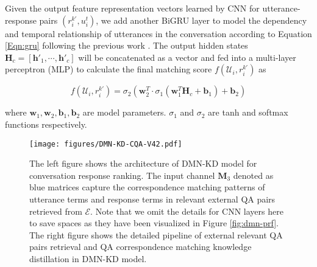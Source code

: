 
Given the output feature representation vectors learned by CNN for utterance-response pairs $(r_i^{k'}, u_i^t)$, we add another BiGRU layer to model the dependency and temporal relationship of utterances in the conversation according to Equation \ref{Eqn:gru} following the previous work \cite{DBLP:conf/acl/WuWXZL17}.  The output hidden states $\mathbf{H}_c = [\mathbf{h'}_1, \cdots, \mathbf{h'}_c]$ will be concatenated as a vector and fed into a multi-layer perceptron (MLP) to calculate the final matching score $f( \mathcal{U}_i, r_i^{k'} ) $  as
 \begin{footnotesize}
\begin{equation}
f( \mathcal{U}_i, r_i^{k'} )  = \sigma_2( \mathbf{w}_2^T \cdot \sigma_1 (\mathbf{w}_1^T\mathbf{H}_c + \mathbf{b}_1    ) + \mathbf{b}_2)
\end{equation}
\end{footnotesize}
where $\mathbf{w}_1, \mathbf{w}_2,\mathbf{b}_1,\mathbf{b}_2$ are model parameters. $\sigma_1$ and $\sigma_2$ are tanh and softmax functions respectively.

\begin{figure*}[th]
	\center
	\texttt{[image: figures/DMN-KD-CQA-V42.pdf]}
	\caption{The left figure shows the architecture of DMN-KD model for conversation response ranking. The input channel $\mathbf{M}_3$ denoted as blue matrices capture the correspondence matching patterns of utterance terms and response terms in relevant external QA pairs retrieved from $\mathcal{E}$. Note that we omit the details for CNN layers here to save spaces as they have been visualized in Figure \ref{fig:dmn-prf}. The right figure shows the detailed pipeline of external relevant QA pairs retrieval and QA correspondence matching knowledge distillation in DMN-KD model. }\label{fig:dmn-kd}
	\vspace{-0.4cm}
\end{figure*}


